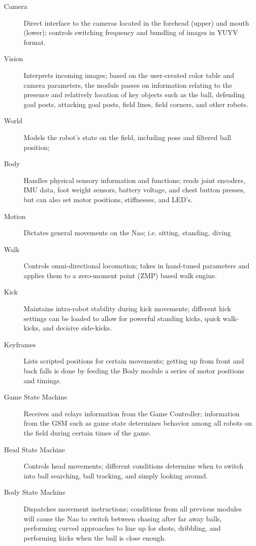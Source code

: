 \documentclass{article}
\begin{document}
	  \begin{description}
		  \item[Camera] Direct interface to the cameras located in the forehead (upper) and mouth (lower); controls switching frequency and bundling of images in YUYV format.
  		\item[Vision] Interprets incoming images; based on the user-created color table and camera parameters, the module passes on information relating to the presence and relatively location of key objects such as the ball, defending goal posts, attacking goal posts, field lines, field corners, and other robots.
	  	\item[World] Models the robot's state on the field, including pose and filtered ball position; 
		  \item[Body] Handles physical sensory information and functions; reads joint encoders, IMU data, foot weight sensors, battery voltage, and chest button presses, but can also set motor positions, stiffnesses, and LED's.
  		\item[Motion] Dictates general movements on the Nao; i.e. sitting, standing, diving	
	  	\item[Walk] Controls omni-directional locomotion; takes in hand-tuned parameters and applies them to a zero-moment point (ZMP) based walk engine.
		  \item[Kick] Maintains intra-robot stability during kick movements; different kick settings can be loaded to allow for powerful standing kicks, quick walk-kicks, and decisive side-kicks.
  		\item[Keyframes] Lists scripted positions for certain movements; getting up from front and back falls is done by feeding the Body module a series of motor positions and timings.
	  	\item[Game State Machine] Receives and relays information from the Game Controller; information from the GSM such as game state determines behavior among all robots on the field during certain times of the game.
		  \item[Head State Machine] Controls head movements; different conditions determine when to switch into ball searching, ball tracking, and simply looking around.
  		\item[Body State Machine] Dispatches movement instructions; conditions from all previous modules will cause the Nao to switch between chasing after far away balls, performing curved approaches to line up for shots, dribbling, and performing kicks when the ball is close enough.
	  \end{description}
\end{document}

